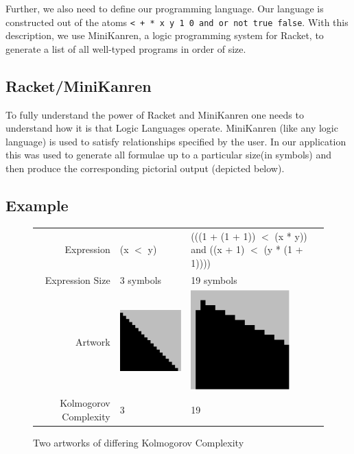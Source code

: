 \documentclass[11pt]{article}
\begin{document}
Further, we also need to define our programming language.  Our language is constructed out of the atoms {\tt < + * x y 1 0 and or not true false}.  With this description, we use MiniKanren, a logic programming system for Racket, to generate a list of all well-typed programs in order of size.

\subsection{Racket/MiniKanren}

To fully understand the power of Racket and MiniKanren one needs to understand 
how it is that Logic Languages operate. MiniKanren (like any logic language) is
used to satisfy relationships specified by the user. In our application this was used
to generate all formulae up to a particular size(in symbols) and then produce the
corresponding pictorial output (depicted below). 


\subsection{Example}
\begin{figure}
\begin{center}
\begin{tabular}{r | p{2in}   p{2in}}
Expression & (x $<$ y) &
(((1 + (1 + 1)) $<$  (x * y)) and 
          ((x + 1) $<$ (y * (1 + 1)))) \\
Expression Size & 3 symbols & 19 symbols\\
  Artwork & \includegraphics[width=1.5in]{../presentation/simple.png} &
  \includegraphics[width=1.5in]{../presentation/complex.png} \\
Kolmogorov Complexity& 3 &
19
\end{tabular}
\end{center}

\caption{Two artworks of differing Kolmogorov Complexity}
\end{figure}
\end{document}

